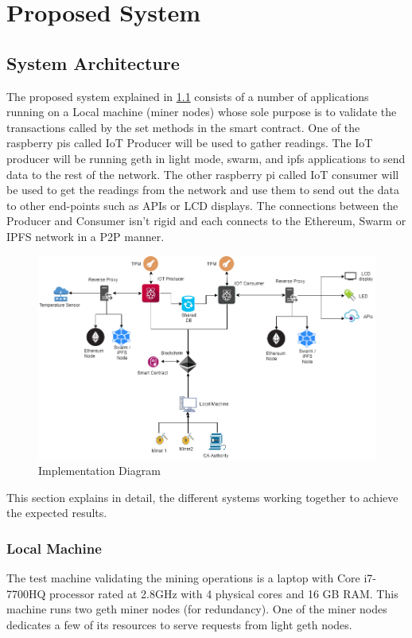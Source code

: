 \documentclass[11pt,openright]{report}
\begin{document}
\chapter{Proposed System} \label{chapter:proposed_system}
\section{System Architecture} \label{ss:construct_architecture}
The proposed system explained in \ref{fig:impldiagram_architechture} consists of a number of applications running on a Local machine (miner nodes) whose sole purpose is to validate the transactions called by the set methods in the smart contract. One of the raspberry pis called IoT Producer will be used to gather readings. The IoT producer will be running geth in light mode, swarm, and ipfs applications to send data to the rest of the network. The other raspberry pi called IoT consumer will be used to get the readings from the network and use them to send out the data to other end-points such as APIs or LCD displays. The connections between the Producer and Consumer isn't rigid and each connects to the Ethereum, Swarm or IPFS network in a P2P manner.

\begin{figure}
	\centering
	\includegraphics[scale=0.5]{images/Final_Implementationv2.png}
	\caption{Implementation Diagram}
	\label{fig:impldiagram_architechture}
\end{figure}


This section explains in detail, the different systems working together to achieve the expected results.

\subsection{Local Machine}
The test machine validating the mining operations is a laptop with Core i7-7700HQ processor rated at 2.8GHz with 4 physical cores and 16 GB RAM. This machine runs two geth miner nodes (for redundancy). One of the miner nodes dedicates a few of its resources to serve requests from light geth nodes.
\end{document}
